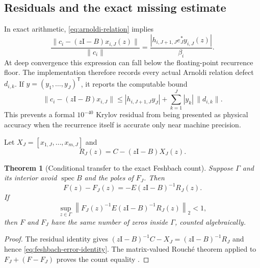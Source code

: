 \documentclass[11pt]{article}
\newtheorem{theorem}{Theorem}[section]
\theoremstyle{definition}
\theoremstyle{remark}
\newcommand{\Id}{\mathrm I}
\newcommand{\spec}{\operatorname{spec}}
\begin{document}
\subsection{Residuals and the exact missing estimate}

In exact arithmetic, \cref{eq:arnoldi-relation} implies
\begin{equation}
 \frac{\|c_i-(z\Id-B)x_{i,J}(z)\|}{\|c_i\|}
 =\frac{|h_{i,J+1,J}e_J^*y_{i,J}(z)|}{\beta_i}.
 \label{eq:ideal-residual}
\end{equation}
At deep convergence this expression can fall below the floating-point
recurrence floor.  The implementation therefore records every actual
Arnoldi relation defect $d_{i,k}$.  If $y=(y_1,\ldots,y_J)^\mathsf T$, it
reports the computable bound
\begin{equation}
 \|c_i-(z\Id-B)x_{i,J}\|
 \le |h_{i,J+1,J}y_J|
    +\sum_{k=1}^J |y_k|\,\|d_{i,k}\|.
 \label{eq:floating-residual-bound}
\end{equation}
This prevents a formal $10^{-40}$ Krylov residual from being presented as
physical accuracy when the recurrence itself is accurate only near machine
precision.

Let $X_J=[x_{1,J},\ldots,x_{m,J}]$ and
\[
 R_J(z)=C-(z\Id-B)X_J(z).
\]

\begin{theorem}[Conditional transfer to the exact Feshbach count]
\label{thm:conditional-rouche}
Suppose $\Gamma$ and its interior avoid $\spec B$ and the poles of $F_J$.
Then
\begin{equation}
 F(z)-F_J(z)=-E(z\Id-B)^{-1}R_J(z).
 \label{eq:feshbach-error-identity}
\end{equation}
If
\begin{equation}
 \sup_{z\in\Gamma}
 \left\|F_J(z)^{-1}E(z\Id-B)^{-1}R_J(z)\right\|_2<1,
 \label{eq:exact-rouche-condition}
\end{equation}
then $F$ and $F_J$ have the same number of zeros inside $\Gamma$, counted
algebraically.
\end{theorem}

\begin{proof}
The residual identity gives
$(z\Id-B)^{-1}C-X_J=(z\Id-B)^{-1}R_J$ and hence
\cref{eq:feshbach-error-identity}.  The matrix-valued Rouch\'e theorem
applied to $F_J+(F-F_J)$ proves the count equality
\citep{GohbergSigal1971}.
\end{proof}
\end{document}
